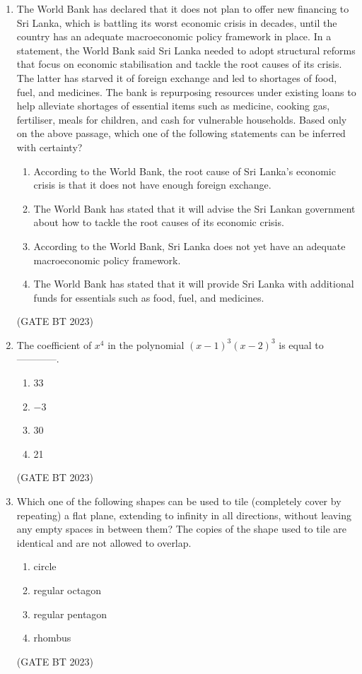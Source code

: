 \documentclass[journal,12pt,onecolumn]{IEEEtran}
\begin{document}
\begin{enumerate}
    \item The World Bank has declared that it does not plan to offer new financing to Sri Lanka, which is battling its worst economic crisis in decades, until the country has an adequate macroeconomic policy framework in place. In a statement, the World Bank said Sri Lanka needed to adopt structural reforms that focus on economic stabilisation and tackle the root causes of its crisis. The latter has starved it of foreign exchange and led to shortages of food, fuel, and medicines. The bank is repurposing resources under existing loans to help alleviate shortages of essential items such as medicine, cooking gas, fertiliser, meals for children, and cash for vulnerable households. Based only on the above passage, which one of the following statements can be inferred with certainty?
    \begin{enumerate}
        \item According to the World Bank, the root cause of Sri Lanka’s economic crisis is that it does not have enough foreign exchange.
        \item The World Bank has stated that it will advise the Sri Lankan government about how to tackle the root causes of its economic crisis.
        \item According to the World Bank, Sri Lanka does not yet have an adequate macroeconomic policy framework.
        \item The World Bank has stated that it will provide Sri Lanka with additional funds for essentials such as food, fuel, and medicines.
    \end{enumerate}
    \hfill(GATE BT 2023)

    \item The coefficient of $x^4$ in the polynomial $(x - 1)^3(x - 2)^3$ is equal to ------------.
    \begin{enumerate}
        \item 33
        \item $-3$
        \item 30
        \item 21
    \end{enumerate}
    \hfill(GATE BT 2023)

    \item Which one of the following shapes can be used to tile (completely cover by repeating) a flat plane, extending to infinity in all directions, without leaving any empty spaces in between them? The copies of the shape used to tile are identical and are not allowed to overlap.
    \begin{enumerate}
        \item circle
        \item regular octagon
        \item regular pentagon
        \item rhombus
    \end{enumerate}
    \hfill(GATE BT 2023)


\end{enumerate}
\end{document}
